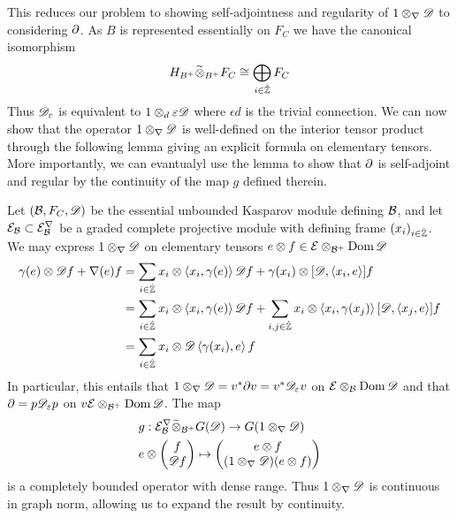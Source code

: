 This reduces our problem to showing self-adjointness and regularity of $1\otimes_\nabla \mathscr{D}$ to considering $\partial$. As $B$ is represented essentially on $F_C$ we have the canonical isomorphism 
\begin{align*}
	H_{B^+}\widetilde{\otimes}_{B^+} F_C \cong \bigoplus_{i\in \hat{\mathbb{Z}}} F_C
\end{align*}
Thus $\mathscr{D}_\varepsilon$ is equivalent to $1\otimes_d \varepsilon \mathscr{D}$ where $\epsilon d$ is the trivial connection. We can now show that the operator $1\otimes_\nabla \mathscr{D}$ is well-defined on the interior tensor product through the following lemma giving an explicit formula on elementary tensors. More importantly, we can evantualyl use the lemma to show that $\partial$ is self-adjoint and regular by the continuity of the map $g$ defined therein. 
\begin{lemma}\label{mesrennie314}
	Let $(\mathcal{B},F_C,\mathscr{D})$ be the essential unbounded Kasparov module defining $\mathcal{B}$, and let $\mathcal{E}_{\mathcal{B}}\subset \mathcal{E}^\nabla_{\mathcal{B}}$ be a graded complete projective module with defining frame $(x_i)_{i\in \hat{\mathbb{Z}}}$. We may express $1\otimes_\nabla \mathscr{D}$ on elementary tensors $e\otimes f\in \mathcal{E}\otimes_{\mathcal{B}^+} \operatorname{Dom} \mathscr{D}$
	\begin{align}
		\gamma(e)\otimes \mathscr{D} f+\nabla(e) f&=\sum_{i\in \hat{\mathbb{Z}}} x_i \otimes \left \langle x_i,\gamma(e) \right \rangle\mathscr{D} f+\gamma(x_i)\otimes [\mathscr{D},\left \langle x_i,e \right \rangle]f  \\
		&=\sum_{i\in \hat{\mathbb{Z}}} x_i \otimes \left \langle x_i,\gamma(e) \right \rangle\mathscr{D} f+\sum_{i,j \in \hat{\mathbb{Z}}} x_i\otimes \left \langle x_i,\gamma(x_j) \right \rangle[\mathscr{D},\left \langle x_j,e \right \rangle]f \label{317} \\ 
		&=\sum_{i\in \hat{\mathbb{Z}}} x_i \otimes \mathscr{D}\left \langle \gamma(x_i),e \right \rangle f
	\end{align}
	In particular, this entails that $1\otimes_\nabla \mathscr{D}=v^* \partial v=v^* \mathscr{D}_\varepsilon v$ on $\mathcal{E} \otimes_{\mathcal{B}} \operatorname{Dom} \mathscr{D}$ and that $\partial=p\mathscr{D}_\varepsilon p$ on $v\mathcal{E} \otimes_{\mathcal{B}^+} \operatorname{Dom} \mathscr{D}$. 
	The map 
	\begin{align*}
		&g:\mathcal{E}^{\nabla}_{\mathcal{B}}\widetilde{\otimes}_{\mathcal{B}^+}G(\mathscr{D})\to G(1\otimes_\nabla \mathscr{D}) \\
		&e\otimes \begin{pmatrix} f \\ \mathscr{D} f\end{pmatrix} \mapsto \begin{pmatrix} e\otimes f  \\ (1\otimes_\nabla \mathscr{D})(e\otimes f) \end{pmatrix}
	\end{align*}
	is a completely bounded operator with dense range. 
	Thus $1\otimes_\nabla \mathscr{D}$ is continuous in graph norm, allowing us to expand the result by continuity. 
\end{lemma}
